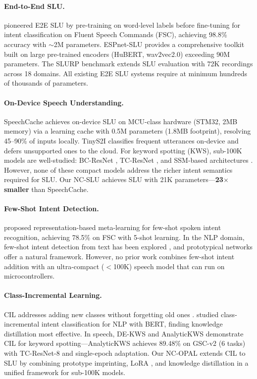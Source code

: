 \documentclass[11pt]{article}
\begin{document}
\paragraph{End-to-End SLU.}
\citet{lugosch2019speech} pioneered E2E SLU by pre-training on word-level labels before fine-tuning for intent classification on Fluent Speech Commands (FSC), achieving 98.8\% accuracy with $\sim$2M parameters.
ESPnet-SLU \cite{arora2023espnetslu} provides a comprehensive toolkit built on large pre-trained encoders (HuBERT, wav2vec2.0) exceeding 90M parameters.
The SLURP benchmark \cite{bastianelli2020slurp} extends SLU evaluation with 72K recordings across 18 domains.
All existing E2E SLU systems require at minimum hundreds of thousands of parameters.

\paragraph{On-Device Speech Understanding.}
SpeechCache \cite{benazir2024speechcache} achieves on-device SLU on MCU-class hardware (STM32, 2MB memory) via a learning cache with 0.5M parameters (1.8MB footprint), resolving 45--90\% of inputs locally.
TinyS2I \cite{tinys2i2022} classifies frequent utterances on-device and defers unsupported ones to the cloud.
For keyword spotting (KWS), sub-100K models are well-studied: BC-ResNet \cite{kim2021bcresnet}, TC-ResNet \cite{choi2019temporal}, and SSM-based architectures \cite{gu2024mamba}.
However, none of these compact models address the richer intent semantics required for SLU.
Our NC-SLU achieves SLU with 21K parameters---\textbf{23$\times$ smaller} than SpeechCache.

\paragraph{Few-Shot Intent Detection.}
\citet{mittal2020fewshot} proposed representation-based meta-learning for few-shot spoken intent recognition, achieving 78.5\% on FSC with 5-shot learning.
In the NLP domain, few-shot intent detection from text has been explored \cite{zhang2020fewshot,xia2021incremental}, and prototypical networks \cite{snell2017prototypical} offer a natural framework.
However, no prior work combines few-shot intent addition with an ultra-compact ($<$100K) speech model that can run on microcontrollers.

\paragraph{Class-Incremental Learning.}
CIL addresses adding new classes without forgetting old ones \cite{rebuffi2017icarl,masana2022class}.
\citet{paul2022incremental} studied class-incremental intent classification for NLP with BERT, finding knowledge distillation most effective.
In speech, DE-KWS \cite{dekws2025} and AnalyticKWS \cite{analytickws2025} demonstrate CIL for keyword spotting---AnalyticKWS achieves 89.48\% on GSC-v2 (6 tasks) with TC-ResNet-8 and single-epoch adaptation.
Our NC-OPAL extends CIL to SLU by combining prototype imprinting, LoRA \cite{hu2022lora}, and knowledge distillation \cite{hinton2015distilling} in a unified framework for sub-100K models.
\end{document}
